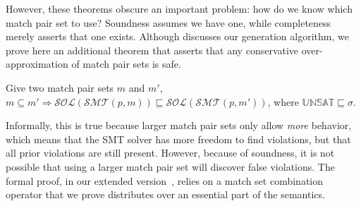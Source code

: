 However, these theorems obscure an important problem: how do we know
which match pair set to use? Soundness assumes we have one, while
completeness merely asserts that one exists. Although 
discusses our generation algorithm, we prove here an additional
theorem that asserts that any conservative over-approximation of match
pair sets is safe.

\begin{theorem}[Approximation]
Give two match pair sets $m$ and $m'$, $m \subseteq m' \Rightarrow \mathcal{SOL}(\mathcal{SMT}(p, m))
  \sqsubseteq \mathcal{SOL}(\mathcal{SMT}(p, m'))$, where
  $\mathbb{UNSAT} \sqsubseteq \sigma$.
\end{theorem}

Informally, this is true because larger match pair sets only allow
\emph{more} behavior, which means that the SMT solver has more freedom
to find violations, but that all prior violations are still
present. However, because of soundness, it is not possible that using
a larger match pair set will discover false violations. The formal
proof, in our extended version~\cite{extended-version}, relies on a
match set combination operator that we prove distributes over an
essential part of the semantics.
